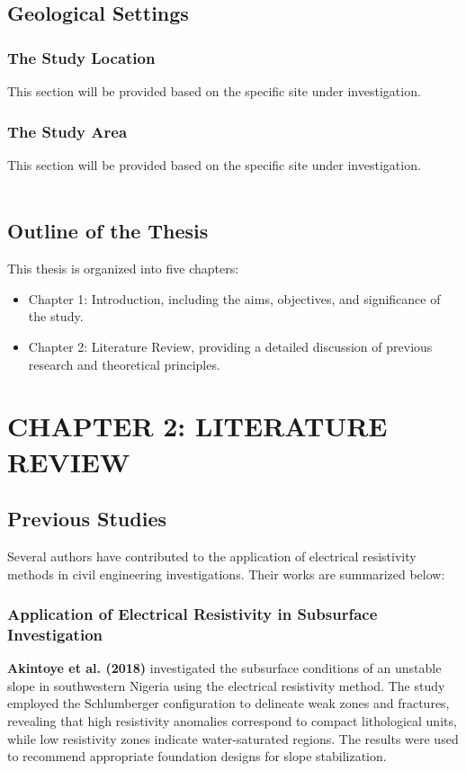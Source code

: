 \documentclass[12pt,a4paper]{report}
\begin{document}
\section{Geological Settings}
\subsection{The Study Location}
This section will be provided based on the specific site under investigation.
\subsection{The Study Area}
This section will be provided based on the specific site under investigation.
\\ \\
\section{Outline of the Thesis}
This thesis is organized into five chapters:
\begin{itemize}
    \item Chapter 1: Introduction, including the aims, objectives, and significance of the study.
    \item Chapter 2: Literature Review, providing a detailed discussion of previous research and theoretical principles.
\end{itemize}

\chapter{CHAPTER 2: LITERATURE REVIEW}

\section{Previous Studies}
Several authors have contributed to the application of electrical resistivity methods in civil engineering investigations. Their works are summarized below:

\subsection{Application of Electrical Resistivity in Subsurface Investigation}
\textbf{Akintoye et al. (2018)} investigated the subsurface conditions of an unstable slope in southwestern Nigeria using the electrical resistivity method. The study employed the Schlumberger configuration to delineate weak zones and fractures, revealing that high resistivity anomalies correspond to compact lithological units, while low resistivity zones indicate water-saturated regions. The results were used to recommend appropriate foundation designs for slope stabilization.
\end{document}
